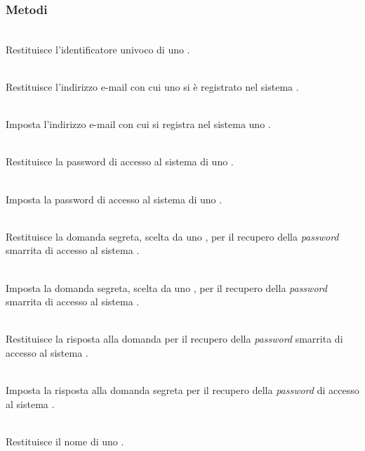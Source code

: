 \subsubsection*{Metodi}
\begin{description}
	\item{}\\
	Restituisce l'identificatore univoco di uno .
	\item{}\\
	Restituisce l'indirizzo e-mail con cui uno  si è registrato nel sistema \caName.
	\item{}\\ 
	Imposta l'indirizzo e-mail con cui si registra nel sistema \caName uno .
	\item{}\\
	Restituisce la password di accesso al sistema \caName di uno .
	\item{}\\
	Imposta la password di accesso al sistema di uno .
	\item{}\\
	Restituisce la domanda segreta, scelta da uno , per il recupero della \textit{password} smarrita di accesso al sistema \caName.
	\item{}\\
	Imposta la domanda segreta, scelta da uno , per il recupero della \textit{password} smarrita di accesso al sistema \caName.
	\item{}\\
	Restituisce la risposta alla domanda per il recupero della \textit{password} smarrita di accesso al sistema \caName.
	\item{}\\
	Imposta la risposta alla domanda segreta per il recupero della \textit{password} di accesso al sistema \caName.
	\item{}\\
	Restituisce il nome di uno .
	\item{}\\

\end{description}
